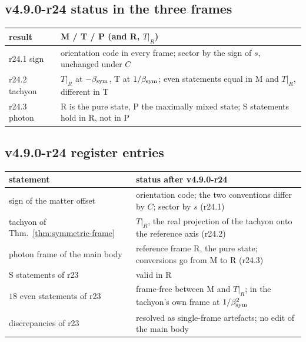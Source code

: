 \subsection*{v4.9.0-r24 status in the three frames}
\label{subsec:v490-r24-frames}

\begin{center}
\small
\begin{tabular}{@{}>{\raggedright\arraybackslash}p{}>{\raggedright\arraybackslash}p{}@{}}
\toprule
result & M / T / P (and R, \(T|_R\))\\
\midrule
r24.1 sign & orientation code in every frame; sector by the sign of \(s\), unchanged under \(C\)\\
r24.2 tachyon & \(T|_R\) at \(-\beta_{\mathrm{sym}}\), T at \(1/\beta_{\mathrm{sym}}\); even statements equal in M and \(T|_R\), different in T\\
r24.3 photon & R is the pure state, P the maximally mixed state; S statements hold in R, not in P\\
\bottomrule
\end{tabular}
\end{center}

\subsection*{v4.9.0-r24 register entries}
\label{subsec:v490-r24-register}

\begin{center}
\small
\begin{tabular}{@{}>{\raggedright\arraybackslash}p{}>{\raggedright\arraybackslash}p{}@{}}
\toprule
statement & status after v4.9.0-r24\\
\midrule
sign of the matter offset & orientation code; the two conventions differ by \(C\); sector by \(s\) (r24.1)\\
tachyon of Thm.~\ref{thm:symmetric-frame} & \(T|_R\), the real projection of the tachyon onto the reference axis (r24.2)\\
photon frame of the main body & reference frame R, the pure state; conversions go from M to R (r24.3)\\
S statements of r23 & valid in R\\
\(18\) even statements of r23 & frame-free between M and \(T|_R\); in the tachyon's own frame at \(1/\beta_{\mathrm{sym}}^2\)\\
discrepancies of r23 & resolved as single-frame artefacts; no edit of the main body\\
\bottomrule
\end{tabular}
\end{center}

